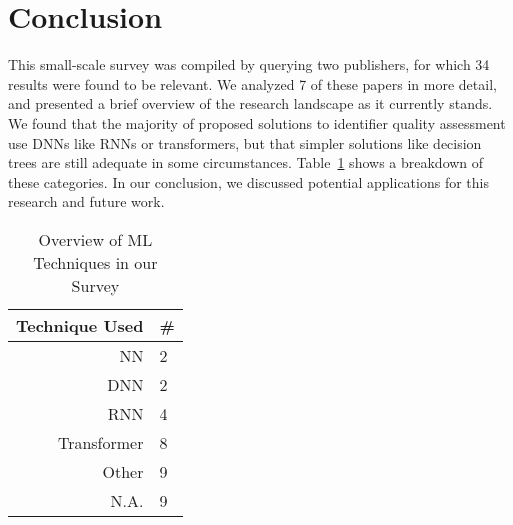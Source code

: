 \documentclass[conference]{IEEEtran}
\begin{document}

\enlargethispage{-18mm}

\section{Conclusion}
\label{sec:Conclusion}

This small-scale survey was compiled by querying two publishers, for which 34 results were
found to be relevant. We analyzed 7 of these papers in more detail, and presented a brief
overview of the research landscape as it currently stands. We found that the majority of
proposed solutions to identifier quality assessment use \acp{DNN} like \acp{RNN} or
transformers, but that simpler solutions like decision trees are still adequate in some
circumstances. Table~\ref{tab:Overview-of-ML-Techniques-in-our-Survey} shows a breakdown
of these categories. In our conclusion, we discussed potential applications for this
research and future work.

\begin{table}[h]
    \centering
    \caption{Overview of \acs{ML} Techniques in our Survey}
    \label{tab:Overview-of-ML-Techniques-in-our-Survey}
    \begin{tabular}{rl} \toprule
        Technique Used & \#\hspace{0.6em} \\ \midrule
        \ac{NN}        & 2 \\
        \ac{DNN}       & 2 \\
        \ac{RNN}       & 4 \\
        Transformer    & 8 \\[1.25ex]
        Other          & 9 \\[1.25ex]
        N.A.\@         & 9 \\ \bottomrule
    \end{tabular}
\end{table}





\end{document}
